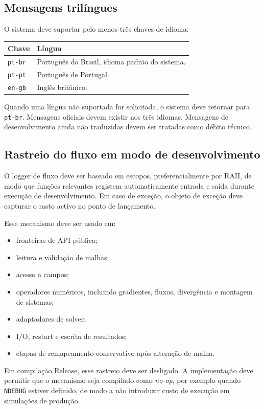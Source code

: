 \documentclass[11pt,a4paper]{article}
\begin{document}
\subsection{Mensagens tril\'ingues}

O sistema deve suportar pelo menos tr\^es chaves de idioma:
\begin{longtable}{p{}p{}}
\toprule
\textbf{Chave} & \textbf{L\'ingua}\\
\midrule
\texttt{pt-br} & Portugu\^es do Brasil, idioma padr\~ao do sistema.\\
\texttt{pt-pt} & Portugu\^es de Portugal.\\
\texttt{en-gb} & Ingl\^es brit\^anico.\\
\bottomrule
\end{longtable}

Quando uma l\'ingua n\~ao suportada for solicitada, o sistema deve retornar para \texttt{pt-br}. Mensagens oficiais devem existir nos tr\^es idiomas. Mensagens de desenvolvimento ainda n\~ao traduzidas devem ser tratadas como d\'ebito t\'ecnico.

\subsection{Rastreio do fluxo em modo de desenvolvimento}

O logger de fluxo deve ser baseado em escopos, preferencialmente por RAII, de modo que fun\c{c}\~oes relevantes registem automaticamente entrada e sa\'ida durante execu\c{c}\~ao de desenvolvimento. Em caso de exce\c{c}\~ao, o objeto de exce\c{c}\~ao deve capturar o rasto activo no ponto de lan\c{c}amento.

Esse mecanismo deve ser usado em:
\begin{itemize}
  \item fronteiras de API p\'ublica;
  \item leitura e valida\c{c}\~ao de malhas;
  \item acesso a campos;
  \item operadores num\'ericos, incluindo gradientes, fluxos, diverg\^encia e montagem de sistemas;
  \item adaptadores de solver;
  \item I/O, restart e escrita de resultados;
  \item etapas de remapeamento conservativo ap\'os altera\c{c}\~ao de malha.
\end{itemize}

Em compila\c{c}\~ao Release, esse rastreio deve ser desligado. A implementa\c{c}\~ao deve permitir que o mecanismo seja compilado como \textit{no-op}, por exemplo quando \texttt{NDEBUG} estiver definido, de modo a n\~ao introduzir custo de execu\c{c}\~ao em simula\c{c}\~oes de produ\c{c}\~ao.
\end{document}
